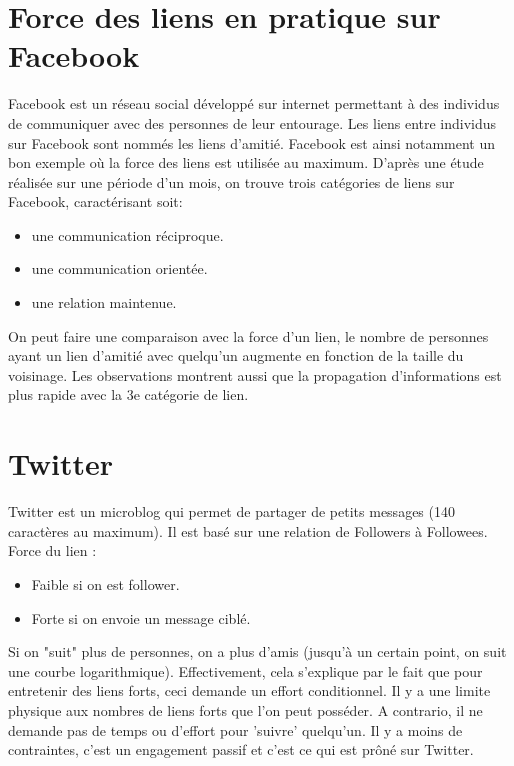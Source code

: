 \section{Force des liens en pratique sur Facebook}
Facebook est un réseau social développé sur internet permettant à des individus de communiquer avec des personnes de leur entourage.
Les liens entre individus sur Facebook sont nommés les liens d'amitié.
Facebook est ainsi notamment un bon exemple où la force des liens est utilisée au maximum.
D'après une étude réalisée sur une période d'un mois, on trouve trois catégories de liens sur Facebook, caractérisant soit:
\begin{itemize}
\item une communication réciproque.
\item une communication orientée.
\item une relation maintenue.
\end{itemize}
On peut faire une comparaison avec la force d'un lien, le nombre de personnes ayant un lien d'amitié avec quelqu'un augmente en fonction de la taille du voisinage. 
Les observations montrent aussi que la propagation d'informations est plus rapide avec la 3e catégorie de lien.
\newline

\section{Twitter}
Twitter est un microblog qui permet de partager de petits messages (140 caractères au maximum). Il est basé sur une relation de Followers à Followees.
Force du lien :
\begin{itemize}
\item Faible si on est follower.
\item Forte si on envoie un message ciblé.
\end{itemize}
Si on "suit" plus de personnes, on a plus d'amis (jusqu'à un certain point, on suit une courbe logarithmique). Effectivement, cela s'explique par le fait que pour entretenir des liens forts, ceci demande un effort conditionnel. Il y a une limite physique aux nombres de liens forts que l'on peut posséder. A contrario, il ne demande pas de temps ou d'effort pour 'suivre' quelqu'un. Il y a moins de contraintes, c'est un engagement passif et c'est ce qui est prôné sur Twitter.
